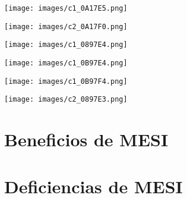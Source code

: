 \documentclass {article}
\begin{document}
\begin{centering} \texttt{[image: images/c1\_0A17E5.png]} \end{centering}
\begin{centering} \texttt{[image: images/c2\_0A17F0.png]} \end{centering}
\begin{centering} \texttt{[image: images/c1\_0897E4.png]} \end{centering}
\begin{centering} \texttt{[image: images/c1\_0B97E4.png]} \end{centering}
\begin{centering} \texttt{[image: images/c1\_0B97F4.png]} \end{centering}
\begin{centering} \texttt{[image: images/c2\_0897E3.png]} \end{centering}




\section{Beneficios de MESI}

\section{Deficiencias de MESI}
\end{document}
